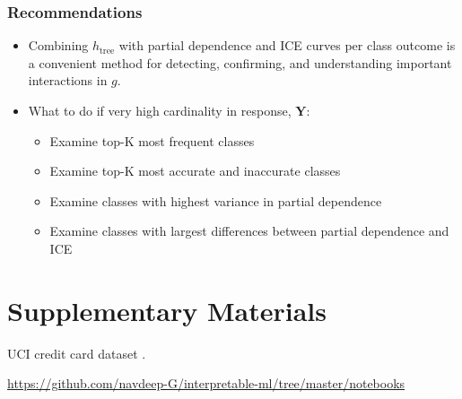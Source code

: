 \documentclass{article}
\begin{document}
\subsubsection{Recommendations}

\begin{itemize}

\item Combining $h_{\text{tree}}$ with partial dependence and ICE curves per class outcome is a convenient method for detecting, confirming, and understanding important interactions in $g$.

\item What to do if very high cardinality in response, $\mathbf{Y}$:

\begin{itemize}

  \item Examine top-K most frequent classes
  \item Examine top-K most accurate and inaccurate classes
  \item Examine classes with highest variance in partial dependence
  \item Examine classes with largest differences between partial dependence and ICE
  
\end{itemize}

\end{itemize}

\section{Supplementary Materials}


UCI credit card dataset \cite{uci}.

\begin{center}
  \url{https://github.com/navdeep-G/interpretable-ml/tree/master/notebooks}
\end{center}
\end{document}
